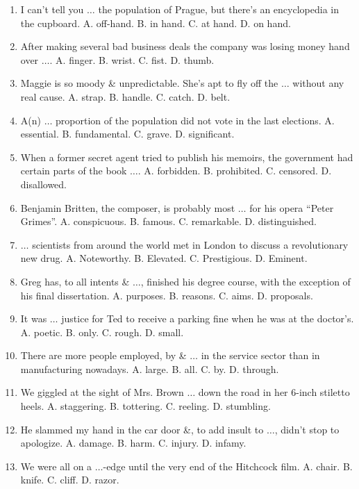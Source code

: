 \documentclass{article}
\numberwithin{equation}{section}
\begin{document}
\begin{enumerate}[leftmargin=8mm]
	\item I can't tell you $\ldots$ the population of Prague, but there's an encyclopedia in the cupboard. {\sf A.} off-hand. {\sf B.} in hand. {\sf C.} at hand. {\sf D.} on hand.
	\item After making several bad business deals the company was losing money hand over $\ldots$. {\sf A.} finger. {\sf B.} wrist. {\sf C.} fist. {\sf D.} thumb.
	\item Maggie is so moody \& unpredictable. She's apt to fly off the $\ldots$ without any real cause. {\sf A.} strap. {\sf B.} handle. {\sf C.} catch. {\sf D.} belt.
	\item A(n) $\ldots$ proportion of the population did not vote in the last elections. {\sf A.} essential. {\sf B.} fundamental. {\sf C.} grave. {\sf D.} significant.
	\item When a former secret agent tried to publish his memoirs, the government had certain parts of the book $\ldots$. {\sf A.} forbidden. {\sf B.} prohibited. {\sf C.} censored. {\sf D.} disallowed.
	\item Benjamin Britten, the composer, is probably most $\ldots$ for his opera ``Peter Grimes''. {\sf A.} conspicuous. {\sf B.} famous. {\sf C.} remarkable. {\sf D.} distinguished.
	\item $\ldots$ scientists from around the world met in London to discuss a revolutionary new drug. {\sf A.} Noteworthy. {\sf B.} Elevated. {\sf C.} Prestigious. {\sf D.} Eminent.
	\item Greg has, to all intents \& $\ldots$, finished his degree course, with the exception of his final dissertation. {\sf A.} purposes. {\sf B.} reasons. {\sf C.} aims. {\sf D.} proposals.
	\item It was $\ldots$ justice for Ted to receive a parking fine when he was at the doctor's. {\sf A.} poetic. {\sf B.} only. {\sf C.} rough. {\sf D.} small.
	\item There are more people employed, by \& $\ldots$ in the service sector than in manufacturing nowadays. {\sf A.} large. {\sf B.} all. {\sf C.} by. {\sf D.} through.
	\item We giggled at the sight of Mrs. Brown $\ldots$ down the road in her 6-inch stiletto heels. {\sf A.} staggering. {\sf B.} tottering. {\sf C.} reeling. {\sf D.} stumbling.
	\item He slammed my hand in the car door \&, to add insult to $\ldots$, didn't stop to apologize. {\sf A.} damage. {\sf B.} harm. {\sf C.} injury. {\sf D.} infamy.
	\item We were all on a $\ldots$-edge until the very end of the Hitchcock film. {\sf A.} chair. {\sf B.} knife. {\sf C.} cliff. {\sf D.} razor.

\end{enumerate}
\end{document}
